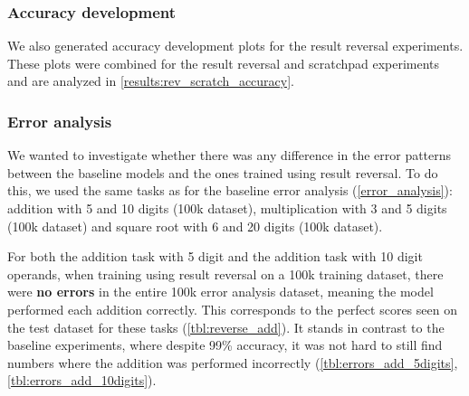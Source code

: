 \begin{table}[!htbp]
	\begin{minipage}[t]{0.47\linewidth}
		\hfill
		\label{tbl:reverse_sqrt_baseline}
	\end{minipage}
	\hfill %
	\begin{minipage}[t]{0.47\linewidth}
		\hfill
		\label{tbl:reverse_sqrt}
	\end{minipage}
\end{table}

\FloatBarrier
\subsubsection{Accuracy development}

We also generated accuracy development plots for the result reversal experiments. These plots were combined for the result reversal and scratchpad experiments and are analyzed in \cref{results:rev_scratch_accuracy}.


\FloatBarrier
\subsubsection{Error analysis}
\label{results:reversal:error}

We wanted to investigate whether there was any difference in the error patterns between the baseline models and the ones trained using result reversal. To do this, we used the same tasks as for the baseline error analysis (\cref{error_analysis}): addition with 5 and 10 digits (100k dataset), multiplication with 3 and 5 digits (100k dataset) and square root with 6 and 20 digits (100k dataset).

For both the addition task with 5 digit and the addition task with 10 digit operands, when training using result reversal on a 100k training dataset, there were \textbf{no errors} in the entire 100k error analysis dataset, meaning the model performed each addition correctly. This corresponds to the perfect scores seen on the test dataset for these tasks (\cref{tbl:reverse_add}).
It stands in contrast to the baseline experiments, where despite 99\% accuracy, it was not hard to still find numbers where the addition was performed incorrectly (\cref{tbl:errors_add_5digits}, \cref{tbl:errors_add_10digits}).

